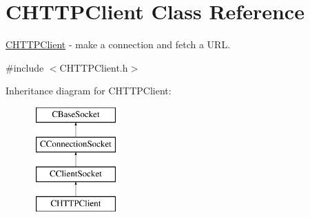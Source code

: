 \hypertarget{class_c_h_t_t_p_client}{\section{\-C\-H\-T\-T\-P\-Client \-Class \-Reference}
\label{class_c_h_t_t_p_client}
}


\hyperlink{class_c_h_t_t_p_client}{\-C\-H\-T\-T\-P\-Client} -\/ make a connection and fetch a \-U\-R\-L.  




{\ttfamily \#include $<$\-C\-H\-T\-T\-P\-Client.\-h$>$}

\-Inheritance diagram for \-C\-H\-T\-T\-P\-Client\-:\begin{figure}[H]
\begin{center}
\leavevmode
\includegraphics[height=4.000000cm]{class_c_h_t_t_p_client}
\end{center}
\end{figure}
